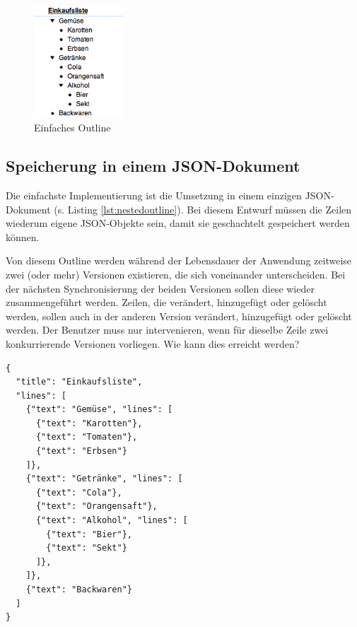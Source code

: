 \medskip
\begin{figure}[ht] 
  \begin{center}
    \includegraphics[width=0.3\textwidth]{grafik/nested-outline} 
  \end{center}
  \caption{Einfaches Outline}
  \label{fig:nestedoutline}
\end{figure}

\subsection{Speicherung in einem JSON-Dokument}

Die einfachste Implementierung ist die Umsetzung in einem einzigen JSON-Dokument (s. Listing \ref{lst:nestedoutline}). Bei diesem Entwurf müssen die Zeilen wiederum eigene JSON-Objekte sein, damit sie geschachtelt gespeichert werden können. 


Von diesem Outline werden während der Lebensdauer der Anwendung zeitweise zwei (oder mehr) Versionen existieren, die sich voneinander unterscheiden. Bei der nächsten Synchronisierung der beiden Versionen sollen diese wieder zusammengeführt werden. Zeilen, die verändert, hinzugefügt oder gelöscht werden, sollen auch in der anderen Version verändert, hinzugefügt oder gelöscht werden. Der Benutzer muss nur intervenieren, wenn für dieselbe Zeile zwei konkurrierende Versionen vorliegen. Wie kann dies erreicht werden?

\medskip
\begin{lstlisting}[caption=Einfaches Outline in einem JSON-Dokument, label={lst:nestedoutline}]
{
  "title": "Einkaufsliste",
  "lines": [
    {"text": "Gemüse", "lines": [
      {"text": "Karotten"},
      {"text": "Tomaten"}, 
      {"text": "Erbsen"}
    ]}, 
    {"text": "Getränke", "lines": [
      {"text": "Cola"},
      {"text": "Orangensaft"}, 
      {"text": "Alkohol", "lines": [
        {"text": "Bier"},
        {"text": "Sekt"}
      ]},
    ]},
    {"text": "Backwaren"}
  ]
}
\end{lstlisting}




